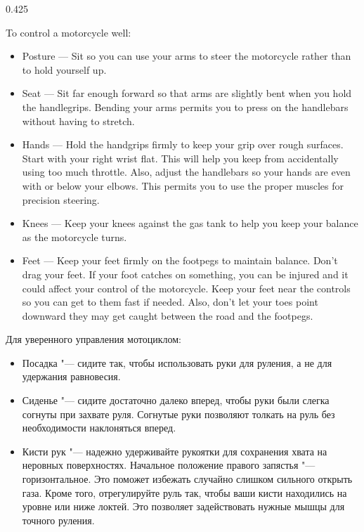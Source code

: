 

\begin{langblock}{0.425}
	\begin{eng}
	To control a motorcycle well:
	\begin{itemize}
		\item Posture --- Sit so you can use your arms to steer the motorcycle rather than to hold yourself up.
		\item Seat --- Sit far enough forward so that arms are slightly bent when you hold the handlegrips. Bending your arms permits you to press on the handlebars without having to stretch.
		\item Hands --- Hold the handgrips firmly to keep your grip over rough surfaces. Start with your right wrist flat. This will help you keep from accidentally using too much throttle. Also, adjust the handlebars so your hands are even with or below your elbows. This permits you to use the proper muscles for precision steering.
		\item Knees --- Keep your knees against the gas tank to help you keep your balance as the motorcycle turns.
		\item Feet --- Keep your feet firmly on the footpegs to maintain balance. Don't drag your feet. If your foot catches on something, you can be injured and it could affect your control of the motorcycle. Keep your feet near the controls so you can get to them fast if needed. Also, don't let your toes point downward they may get caught between the road and the footpegs.
	\end{itemize}
	\end{eng}
	\begin{rus}
		Для уверенного управления мотоциклом:
		\begin{itemize}
			\item Посадка "--- сидите так, чтобы использовать руки для руления, а не для удержания равновесия.
			\item Сиденье "--- сидите достаточно далеко вперед, чтобы руки были слегка согнуты при захвате руля. Согнутые руки позволяют толкать на руль без необходимости наклоняться вперед.
			\item Кисти рук "--- надежно удерживайте рукоятки для сохранения хвата на неровных поверхностях. Начальное положение правого запястья "--- горизонтальное. Это поможет избежать случайно слишком сильного открыть газа. Кроме того, отрегулируйте руль так, чтобы ваши кисти находились на уровне или ниже локтей. Это позволяет задействовать нужные мышцы для точного руления.

\end{itemize}
\end{rus}
\end{langblock}
